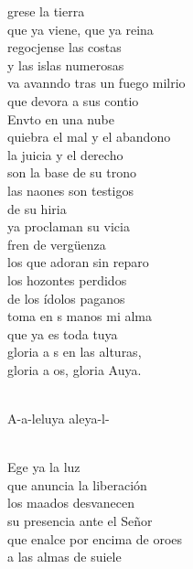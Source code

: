 \begin{cancion}%
	grese la tierra  \\
que ya viene, que ya reina\\
	regocjense las costas \\
y las islas numerosas\\
	va avanndo tras un fuego milrio\\
	que devora a sus contio\\
\jump
	Envto en una nube \\
quiebra el mal y el abandono\\
	la juicia y el derecho \\
son la base de su trono\\
	las naones son testigos \\
	de su hiria\\
	ya proclaman su vicia\\
\jump
	fren de vergüenza \\
los que adoran sin reparo\\
	los hozontes perdidos \\
de los ídolos paganos\\
	toma en s manos mi alma \\
	que ya es toda tuya\\
	gloria a s en las alturas, \\
	gloria a os, gloria Auya.\\\jump\\
	\begin{chorus}%
	A-a-leluya aleya-l-\\
	\end{chorus}%
	\jump\\
	Ege ya la luz \\
que anuncia la liberación\\
	los maados desvanecen \\
su presencia ante el Señor\\
	que enalce por encima de oroes\\
	a las almas de suiele\\

\end{cancion}
